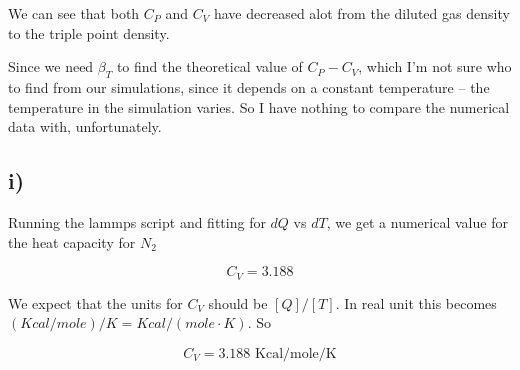 \documentclass[a4paper,norsk, 10pt]{article}
\begin{document}
We can see that both $C_P$ and $C_V$ have decreased alot from the diluted gas density to the triple point density.

Since we need $\beta_T$ to find the theoretical value of $C_P - C_V$, which I'm not sure who to find from our simulations, since it depends on a constant temperature -- the temperature in the simulation varies. So I have nothing to compare the numerical data with, unfortunately.

\subsection{i)}
Running the lammps script and fitting for $dQ$ vs $dT$, we get a numerical value for the heat capacity for $N_2$

\begin{equation}
C_V = 3.188
\end{equation}

We expect that the units for $C_V$ should be $[Q]/[T]$. In real unit this becomes $(Kcal/mole)/K = Kcal/(mole\cdot K)$. So

\begin{equation}
C_V = 3.188 \text{ Kcal/mole/K}
\end{equation}
\end{document}
